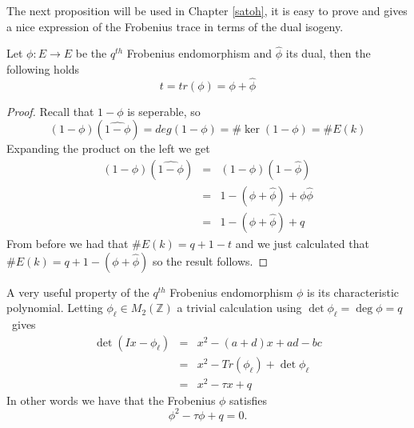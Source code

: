 The next proposition will be used in Chapter \ref{satoh}, it is easy to prove and gives a nice
expression of the Frobenius trace in terms of the dual isogeny.

\begin{prop}
 Let $\phi: E \rightarrow E$ be the $q^{th}$ Frobenius endomorphism and $\widehat{\phi}$ its dual, then
the following holds
$$ t = tr(\phi) = \phi + \widehat{\phi}$$
\end{prop}
\begin{proof}
 Recall that $1-\phi$ is seperable, so $$(1-\phi)(\widehat{1-\phi}) = deg(1-\phi) = \#\ker(1-\phi) = \#E(k)$$
Expanding the product on the left we get
\begin{eqnarray}
 (1-\phi)(\widehat{1-\phi}) &=& (1-\phi)(1-\widehat{\phi}) \nonumber \\
			    &=& 1 - (\phi + \widehat{\phi}) + \phi\widehat{\phi} \nonumber \\
			    &=& 1 - (\phi + \widehat{\phi}) + q \nonumber
\end{eqnarray}
From before we had that $\#E(k) = q + 1 - t$ and we just calculated that $\#E(k) = q + 1 - (\phi +\widehat{\phi})$ so
the result follows.
\end{proof}

A very useful property of the $q^{th}$ Frobenius endomorphism $\phi$ is its characteristic polynomial. Letting
$\phi_\ell\in M_2(\mathbb{Z})$ a trivial calculation using $\det \phi_\ell = \deg \phi = q\,$ gives
\begin{eqnarray}
  \det(Ix - \phi_\ell) &=& x^2 -(a+d)x + ad - bc \nonumber \\
		       &=& x^2 - Tr(\phi_\ell) + \det \phi_\ell \nonumber \\
		       &=& x^2 -\tau x + q \nonumber
\end{eqnarray}
In other words we have that the Frobenius $\phi$ satisfies
$$ \phi^2 - \tau \phi + q = 0.$$